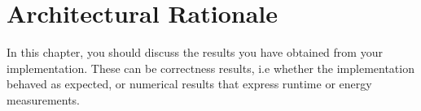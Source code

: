 \chapter{Architectural Rationale}
In this chapter, you should discuss the results you have obtained from your implementation.
These can be correctness results, i.e whether the implementation behaved as expected, or numerical results that express runtime or energy measurements.